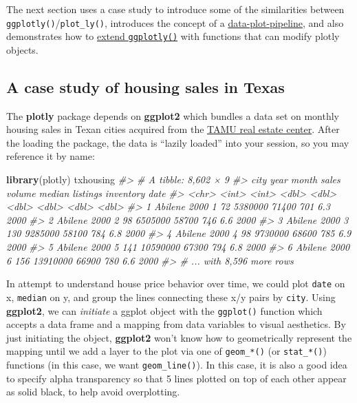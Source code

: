 \documentclass[12pt,]{isuthesis}
\newenvironment{Shaded}{\begin{snugshade}}{\end{snugshade}}
\newcommand{\KeywordTok}[1]{\textcolor[rgb]{0.13,0.29,0.53}{\textbf{{#1}}}}
\newcommand{\CommentTok}[1]{\textcolor[rgb]{0.56,0.35,0.01}{\textit{{#1}}}}
\newcommand{\NormalTok}[1]{{#1}}
\begin{document}
The next section uses a case study to introduce some of the similarities
between \texttt{ggplotly()}/\texttt{plot\_ly()}, introduces the concept
of a \protect\hyperlink{the-data-plot-pipeline}{data-plot-pipeline}, and
also demonstrates how to \protect\hyperlink{extending-ggplotly}{extend
\texttt{ggplotly()}} with functions that can modify plotly objects.

\subsection{A case study of housing sales in
Texas}\label{a-case-study-of-housing-sales-in-texas}

The \textbf{plotly} package depends on \textbf{ggplot2} which bundles a
data set on monthly housing sales in Texan cities acquired from the
\href{http://recenter.tamu.edu/}{TAMU real estate center}. After the
loading the package, the data is ``lazily loaded'' into your session, so
you may reference it by name:

\begin{Shaded}
\begin{Highlighting}[]
\KeywordTok{library}\NormalTok{(plotly)}
\NormalTok{txhousing}
\CommentTok{#> # A tibble: 8,602 × 9}
\CommentTok{#>      city  year month sales   volume median listings inventory  date}
\CommentTok{#>     <chr> <int> <int> <dbl>    <dbl>  <dbl>    <dbl>     <dbl> <dbl>}
\CommentTok{#> 1 Abilene  2000     1    72  5380000  71400      701       6.3  2000}
\CommentTok{#> 2 Abilene  2000     2    98  6505000  58700      746       6.6  2000}
\CommentTok{#> 3 Abilene  2000     3   130  9285000  58100      784       6.8  2000}
\CommentTok{#> 4 Abilene  2000     4    98  9730000  68600      785       6.9  2000}
\CommentTok{#> 5 Abilene  2000     5   141 10590000  67300      794       6.8  2000}
\CommentTok{#> 6 Abilene  2000     6   156 13910000  66900      780       6.6  2000}
\CommentTok{#> # ... with 8,596 more rows}
\end{Highlighting}
\end{Shaded}

In attempt to understand house price behavior over time, we could plot
\texttt{date} on x, \texttt{median} on y, and group the lines connecting
these x/y pairs by \texttt{city}. Using \textbf{ggplot2}, we can
\emph{initiate} a ggplot object with the \texttt{ggplot()} function
which accepts a data frame and a mapping from data variables to visual
aesthetics. By just initiating the object, \textbf{ggplot2} won't know
how to geometrically represent the mapping until we add a layer to the
plot via one of \texttt{geom\_*()} (or \texttt{stat\_*()}) functions (in
this case, we want \texttt{geom\_line()}). In this case, it is also a
good idea to specify alpha transparency so that 5 lines plotted on top
of each other appear as solid black, to help avoid overplotting.
\end{document}
